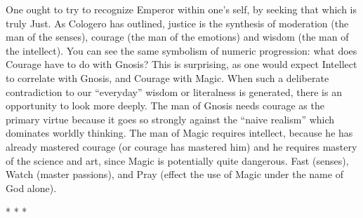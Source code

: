 One ought to try to recognize Emperor within one's self, by seeking that which is truly Just. As Cologero has outlined, justice is the synthesis of moderation (the man of the senses), courage (the man of the emotions) and wisdom (the man of the intellect). You can see the same symbolism of numeric progression: what does Courage have to do with Gnosis? This is surprising, as one would expect Intellect to correlate with Gnosis, and Courage with Magic. When such a deliberate contradiction to our ``everyday'' wisdom or literalness is generated, there is an opportunity to look more deeply. The man of Gnosis needs courage as the primary virtue because it goes so strongly against the ``naive realism'' which dominates worldly thinking. The man of Magic requires intellect, because he has already mastered courage (or courage has mastered him) and he requires mastery of the science and art, since Magic is potentially quite dangerous. Fast (senses), Watch (master passions), and Pray (effect the use of Magic under the name of God alone).



\begin{center}* * *\end{center}

